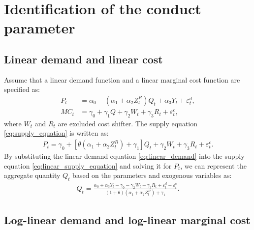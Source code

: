 \documentclass[11pt, a4paper]{article}
\begin{document}
\section{Identification of the conduct parameter}

\subsection{Linear demand and linear cost}
Assume that a linear demand function and a linear marginal cost function are specified as:
\begin{align}
    P_t &= \alpha_0 - (\alpha_1 + \alpha_2Z^{R}_{t})Q_t + \alpha_3 Y_t + \varepsilon^{d}_{t},\label{eq:linear_demand}\\
    MC_t &= \gamma_0  + \gamma_1 Q + \gamma_2 W_{t} + \gamma_3 R_t + \varepsilon^{c}_{t},\label{eq:linear_marginal_cost}
\end{align}
where $W_{t}$ and $R_t$ are excluded cost shifter. The supply equation  \eqref{eq:supply_equation} is written as:
\begin{align}
    P_t = \gamma_0 + [\theta(\alpha_1 + \alpha_2Z^{R}_{t})+ \gamma_1] Q_t   + \gamma_2 W_{t} + \gamma_3 R_t + \varepsilon^{c}_{t}.\label{eq:linear_supply_equation}
\end{align}
By substituting the linear demand equation \eqref{eq:linear_demand} into the supply equation \eqref{eq:linear_supply_equation} and solving it for $P_t$, we can represent the aggregate quantity $Q_t$ based on the parameters and exogenous variables as:
\begin{align*}
    Q_t =  \frac{\alpha_0 + \alpha_3 Y_t - \gamma_0 - \gamma_2 W_{t} - \gamma_3 R_t + \varepsilon^{d}_{t} - \varepsilon^{c}_{t}}{(1 + \theta) (\alpha_1 + \alpha_2 Z^{R}_{t}) + \gamma_1}.
\end{align*}


\subsection{Log-linear demand and log-linear marginal cost}
\end{document}
